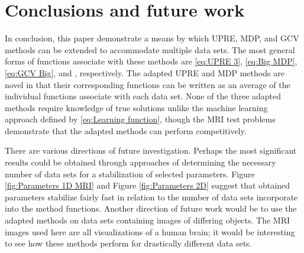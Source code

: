 \documentclass[12pt]{article}
\begin{document}
\section{Conclusions and future work} \label{sec:Conclusion}
In conclusion, this paper demonstrate a means by which UPRE, MDP, and GCV methods can be extended to accommodate multiple data sets. The most general forms of functions associate with these methods are \eqref{eq:UPRE 3}, \eqref{eq:Big MDP}, \eqref{eq:GCV Big}, and , respectively. The adapted UPRE and MDP methods are novel in that their corresponding functions can be written as an average of the individual functions associate with each data set. None of the three adapted methods require knowledge of true solutions unlike the machine learning approach defined by \eqref{eq:Learning function}, though the MRI test problems demonstrate that the adapted methods can perform competitively. \par
There are various directions of future investigation. Perhaps the most significant results could be obtained through approaches of determining the necessary number of data sets for a stabilization of selected parameters. Figure \ref{fig:Parameters 1D MRI} and Figure \ref{fig:Parameters 2D} suggest that obtained parameters stabilize fairly fast in relation to the number of data sets incorporate into the method functions. Another direction of future work would be to use the adapted methods on data sets containing images of differing objects. The MRI images used here are all visualizations of a human brain; it would be interesting to see how these methods perform for drastically different data sets.



\end{document}
